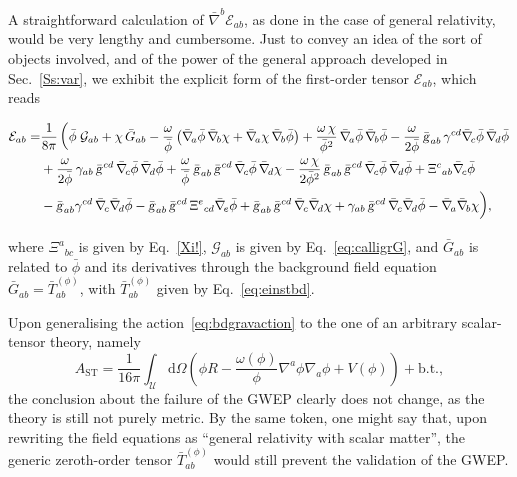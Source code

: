 \documentclass[a4paper,showkeys,aps,prd,reprint,nofootinbib,showpacs,twocolumn]{revtex4-1}
\newcommand{\de}{\mathrm{d}}
\newcommand{\ton}[1]{\left(#1\right)}
\newcommand{\eq}[1]{\( #1 \)}
\newcommand{\eqd}[1]{\begin{equation} #1 \end{equation}}
\newcommand{\speq}[1]{\begin{equation}\begin{split}#1\end{split}\end{equation}}
\newcommand{\Cal}[1]{\mathcal{#1}}
\newcommand{\matg}{\text{\textsl{g}}}%
\theoremstyle{plain}
\begin{document}
A straightforward calculation of \eq{ \bar{\nabla}^b \Cal{E}_{ab}}, as done in the case of general relativity, would be very lengthy and cumbersome.  Just to convey an idea of the sort of objects involved, and of the power of the general approach developed in Sec.~\ref{Ss:var}, we exhibit the explicit form of the first-order tensor \eq{\Cal{E}_{ab}}, which reads
%
\begin{widetext}
%
\speq{\Cal{E}_{ab} = &\frac{1}{8\pi}\left(\bar{\phi}\; \Cal{G}_{ab} + \chi\, \bar{G}_{ab} - \frac{\omega}{\bar{\phi}} \ton{\bar{\nabla}_{\! a} \bar{\phi}\, \bar{\nabla}_{\! b} \chi + \bar{\nabla}_{\! a} \chi\, \bar{\nabla}_{\! b} \bar{\phi}} + \frac{\omega\,\chi}{\bar{\phi}^2}\, \bar{\nabla}_{\! a} \bar{\phi}\, \bar{\nabla}_{\! b} \bar{\phi} - \frac{\omega}{2 \bar{\phi}}\, \bar{\matg}_{a b}\, \gamma^{c d} \bar{\nabla}_{\! c} \bar{\phi}\, \bar{\nabla}_{\! d} \bar{\phi} \right. \\
&+ \frac{\omega}{2 \bar{\phi}}\, \gamma_{a b}\,\bar{\matg}^{cd}\, \bar{\nabla}_{\! c} \bar{\phi}\, \bar{\nabla}_{\! d} \bar{\phi} + \frac{\omega}{\bar{\phi}}\, \bar{\matg}_{a b}\,\bar{\matg}^{cd}\, \bar{\nabla}_{\! c} \bar{\phi}\, \bar{\nabla}_{\! d} \chi -\frac{\omega\,\chi}{2\bar{\phi}^2}\,\bar{\matg}_{ab}\,\bar{\matg}^{cd}\,\bar{\nabla}_{\! c}\bar{\phi}\,\bar{\nabla}_{\! d}\bar{\phi} + {\Xi^c}_{ab} \bar{\nabla}_{\! c} \bar{\phi} \\
&- \biggl.\bar{\matg}_{a b} \gamma^{cd}\, \bar{\nabla}_{\! c} \bar{\nabla}_{\! d} \bar{\phi} - \bar{\matg}_{a b}\, \bar{\matg}^{cd}\, {\Xi^e}_{cd} \bar{\nabla}_{\! e} \bar{\phi} + \bar{\matg}_{a b}\,\bar{\matg}^{cd}\, \bar{\nabla}_{\! c}\bar{\nabla}_{\! d} \chi + \gamma_{ab}\,\bar{\matg}^{cd}\, \bar{\nabla}_{\! c}\bar{\nabla}_{\! d} \bar{\phi} - \bar{\nabla}_{\! a} \bar{\nabla}_{\! b} \chi \biggr),}
%
\end{widetext}
%
where \eq{{\Xi^{a}}_{bc}} is given by Eq.~\eqref{Xi!}, \eq{\Cal{G}_{ab}} is given by Eq.~\eqref{eq:calligrG}, and \eq{\bar{G}_{ab}} is related to \eq{\bar{\phi}} and its derivatives through the background field equation \eq{\bar{G}_{ab} = \bar{T}^{(\phi)}_{ab}}, with $\bar{T}^{(\phi)}_{ab}$ given by  Eq.~\eqref{eq:einstbd}.

Upon generalising the action~\eqref{eq:bdgravaction} to the one of an arbitrary scalar-tensor theory, namely
%
\eqd{A_{\text{ST}} = \frac{1}{16\pi} \int_{\mathscr{U}} \!\! \de \Omega \ton{\phi R - \frac{\omega \ton{\phi}}{\phi} \nabla^{a} \phi \nabla_{\! a} \phi +  V \ton{\phi}} + \text{b.t.},}
%
the conclusion about the failure of the GWEP clearly does not change, as the theory is still not purely metric.  By the same token, one might say that, upon rewriting the field equations as ``general relativity with scalar matter'', the generic zeroth-order tensor \eq{\bar{T}^{(\phi)}_{ab}} would still prevent the validation of the GWEP.
\end{document}
